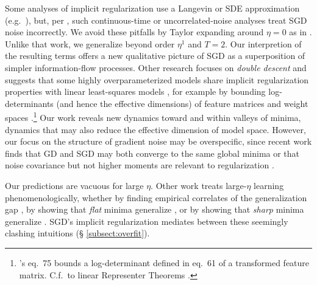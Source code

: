             Some analyses of implicit regularization use a Langevin or SDE
            approximation (e.g.\ \citet{ch18,zh19}), but, per \citet{ya19a},
            such continuous-time or uncorrelated-noise analyses treat SGD noise
            incorrectly.
            We avoid these pitfalls by Taylor expanding around $\eta=0$ as in
            \citet{ro18}.  Unlike that work, we generalize beyond order $\eta^1$
            and $T=2$.  %
            Our interpretion of the resulting
            terms offers a new qualitative picture of SGD as a superposition of
            simpler information-flow processes.
            Other research focuses on \emph{double descent} and suggests that
            some highly overparameterized models share implicit regularization
            properties with linear least-squares models \citep{be19}, for
            example by bounding log-determinants (and hence the effective
            dimensions) of feature matrices and weight spaces
            \citep{me20}.\footnote{
                \cite{me20}'s eq.\ 75 bounds a log-determinant defined in eq.\
                61 of a transformed feature matrix.  C.f.\ to linear
                Representer Theorems \citep{mo18b}.
            }
%
            Our work reveals new dynamics toward and within valleys of minima,
            dynamics that may also reduce the effective dimension of model space.
            However, our focus on the structure of gradient noise may be
            overspecific, since recent work finds that GD and SGD may both
            converge to the same global minima \citep{zo20} or that
            noise covariance but not higher moments are relevant to
            regularization \citep{wu20}. 

        
            Our predictions are vacuous for large $\eta$.  Other work treats
            large-$\eta$ learning phenomenologically, whether by finding
            empirical correlates of the generalization gap \citep{li18}, by
            showing that \emph{flat} minima generalize \citep{ho17,ke17,wa18},
            or by showing that \emph{sharp} minima generalize
            \citep{st56,di17,wu18}.  SGD's implicit regularization mediates
            between these seemingly clashing intuitions (\S
            \ref{subsect:overfit}).
            
